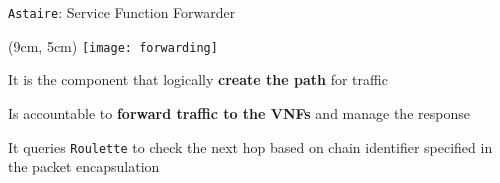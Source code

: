 \begin{frame}{\texttt{Astaire}: Service Function Forwarder}

  \begin{textblock*}{1cm}(9cm, 5cm)
    \texttt{[image: forwarding]}
  \end{textblock*}

  It is the component that logically \textbf{create the path} for traffic

  \vfill{}

  Is accountable to \textbf{forward traffic to the VNFs} and manage the response

  \vfill{}

  It queries \texttt{Roulette} to check the next hop based on chain identifier
  specified in the packet encapsulation

\end{frame}